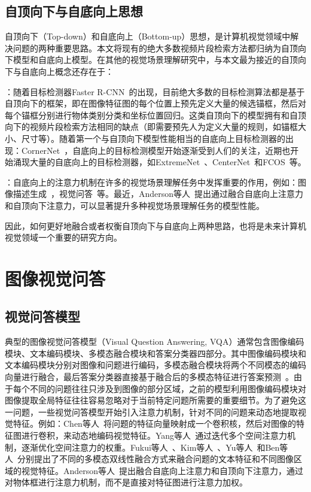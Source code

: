 \subsection{自顶向下与自底向上思想}
自顶向下（Top-down）和自底向上（Bottom-up）思想，是计算机视觉领域中解决问题的两种重要思路。本文将现有的绝大多数视频片段检索方法都归纳为自顶向下模型和自底向上模型。在其他的视觉场景理解研究中，与本文最为接近的自顶向下与自底向上概念还存在于：

\textbf{}：随着目标检测器Faster R-CNN~\cite{ren2015faster}的出现，目前绝大多数的目标检测算法都是基于自顶向下的框架，即在图像特征图的每个位置上预先定义大量的候选锚框，然后对每个锚框分别进行物体类别分类和坐标位置回归。这类自顶向下的模型拥有和自顶向下的视频片段检索方法相同的缺点（即需要预先人为定义大量的规则，如锚框大小、尺寸等）。随着第一个与自顶向下模型性能相当的自底向上目标检测器的出现：CornerNet~\cite{law2018cornernet}，自底向上的目标检测模型开始逐渐受到人们的关注，近期也开始涌现大量的自底向上的目标检测器，如ExtremeNet~\cite{zhou2019bottom}、CenterNet~\cite{zhou2019objects,duan2019centernet}和FCOS~\cite{tian2019fcos}等。

\textbf{}：自底向上的注意力机制在许多的视觉场景理解任务中发挥重要的作用，例如：图像描述生成~\cite{xu2015show,chen2017sca}，视觉问答~\cite{xu2016ask,ye2017video}等。最近，Anderson等人~\cite{anderson2018bottom}提出通过融合自底向上注意力和自顶向下注意力，可以显著提升多种视觉场景理解任务的模型性能。

因此，如何更好地融合或者权衡自顶向下与自底向上两种思路，也将是未来计算机视觉领域一个重要的研究方向。


\section{图像视觉问答}

\subsection{视觉问答模型}

典型的图像视觉问答模型（Visual Question Answering, VQA）通常包含图像编码模块、文本编码模块、多模态融合模块和答案分类器四部分。其中图像编码模块和文本编码模块分别对图像和问题进行编码，多模态融合模块将两个不同模态的编码向量进行融合，最后答案分类器直接基于融合后的多模态特征进行答案预测~\cite{zhou2015simple,antol2015vqa,kim2016multimodal}。由于每个不同的问题往往只涉及到图像的部分区域，之前的模型利用图像编码模块对图像提取全局特征往往容易忽略对于当前特定问题所需要的重要细节。为了避免这一问题，一些视觉问答模型开始引入注意力机制，针对不同的问题来动态地提取视觉特征。例如：Chen等人~\cite{chen2016abc}将问题的特征向量映射成一个卷积核，然后对图像的特征图进行卷积，来动态地编码视觉特征。Yang等人~\cite{yang2016stacked}通过迭代多个空间注意力机制，逐渐优化空间注意力的权重。Fukui等人~\cite{fukui2016multimodal}、Kim等人~\cite{kim2017hadamard,kim2018bilinear}、Yu等人~\cite{yu2017multi,yu2018beyond}和Ben等人~\cite{ben2017mutan,ben2019block}分别提出了不同的多模态双线性融合方式来融合问题的文本特征和不同图像区域的视觉特征。Anderson等人~\cite{anderson2018bottom}提出融合自底向上注意力和自顶向下注意力，通过对物体框进行注意力机制，而不是直接对特征图进行注意力加权。

